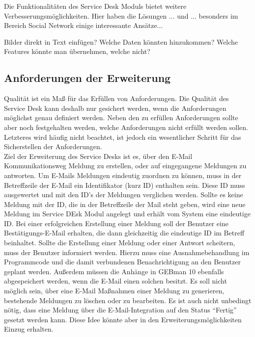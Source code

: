 \noindent
Die Funktionalitäten des Service Desk Moduls bietet weitere Verbesserungsmöglichkeiten. Hier haben die Lösungen ... und ... besonders im Bereich Social Network einige interessante Ansätze... \\

\noindent




Bilder direkt in Text einfügen?
Welche Daten könnten hinzukommen?
Welche Features könnte man übernehmen, welche nicht?

\subsection{Anforderungen der Erweiterung}

\noindent
Qualität ist ein Maß für das Erfüllen von Anforderungen. Die Qualität des Service Desk kann deshalb nur gesichert werden, wenn die Anforderungen möglichst genau definiert werden. Neben den zu erfüllen Anforderungen sollte aber noch festgehalten werden, welche Anforderungen nicht erfüllt werden sollen. Letzteres wird häufig nicht beachtet, ist jedoch ein wesentlicher Schritt für das Sicherstellen der Anforderungen.\\
\noindent
Ziel der Erweiterung des Service Desks ist es, über den E-Mail Kommunikationsweg Meldung zu erstellen, oder auf eingegangene Meldungen zu antworten. Um E-Mails Meldungen eindeutig zuordnen zu können, muss in der Betreffzeile der E-Mail ein Identifikator (kurz ID) enthalten sein. Diese ID muss ausgewertet und mit den ID's der Meldungen verglichen werden. Sollte es keine Meldung mit der ID, die in der Betreffzeile der Mail steht geben, wird eine neue Meldung im Service DEsk Modul angelegt und erhält vom System eine eindeutige ID. Bei einer erfolgreichen Erstellung einer Meldung soll der Benutzer eine Bestätigungs-E-Mail erhalten, die dann gleichzeitig die eindeutige ID im Betreff beinhaltet. Sollte die Erstellung einer Meldung oder einer Antwort scheitern, muss der Benutzer informiert werden. Hierzu muss eine Ausnahmebehandlung im Programmcode und die damit verbundenen Benachrichtigung an den Benutzer geplant werden. Außerdem müssen die Anhänge in GEBman 10 ebenfalls abgespeichert werden, wenn die E-Mail einen solchen besitzt. \newline
Es soll nicht möglich sein, über eine E-Mail Maßnahmen einer Meldung zu generieren, bestehende Meldungen zu löschen oder zu bearbeiten. Es ist auch nicht unbedingt nötig, dass eine Meldung über die E-Mail-Integration auf den Status \enquote{Fertig} gesetzt werden kann. Diese Idee könnte aber in den Erweiterungsmöglichkeiten Einzug erhalten.


